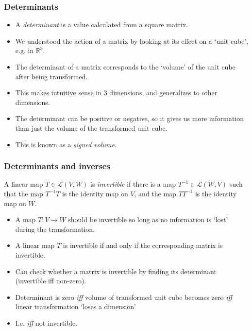 \documentclass[handout]{beamer}
\newcommand{\bR}{\mathbb{R}}
\newcommand{\cL}{\mathcal{L}}
\begin{document}
\begin{frame}
\frametitle{Determinants}
\begin{itemize}
\item A \emph{determinant} is a value calculated from a square matrix.\vspace{0.2cm}
\item We understood the action of a matrix by looking at its effect on a `unit cube', e.g. in $\bR^3$.\vspace{0.2cm}
\item The determinant of a matrix corresponds to the `volume' of the unit cube after being transformed.\vspace{0.2cm}
\item This makes intuitive sense in 3 dimensions, and generalizes to other dimensions.\vspace{0.2cm}
\item The determinant can be positive or negative, so it gives us more information than just the volume of the transformed unit cube.\vspace{0.2cm}
\item This is known as a \emph{signed volume}.
\end{itemize} 
\end{frame}

\begin{frame}
\frametitle{Determinants and inverses}
\begin{definition}
A linear map $T\in\cL(V,W)$ is \emph{invertible} if there is a map $T^{-1}\in\cL(W,V)$ such that the map $T^{-1}T$ is the identity map on $V$, and the map $TT^{-1}$ is the identity map on $W$.   
\end{definition}
\begin{itemize}
\item A map $T:V\to W$ should be invertible so long as no information is `lost' during the transformation.
\item A linear map $T$ is invertible if and only if the corresponding matrix is invertible.
\item Can check whether a matrix is invertible by finding its determinant (invertible iff non-zero).
\item Determinant is zero \emph{iff} volume of transformed unit cube becomes zero \emph{iff} linear transformation `loses a dimension' 
\item I.e. \emph{iff} not invertible.
\end{itemize} 
\end{frame}
\end{document}
